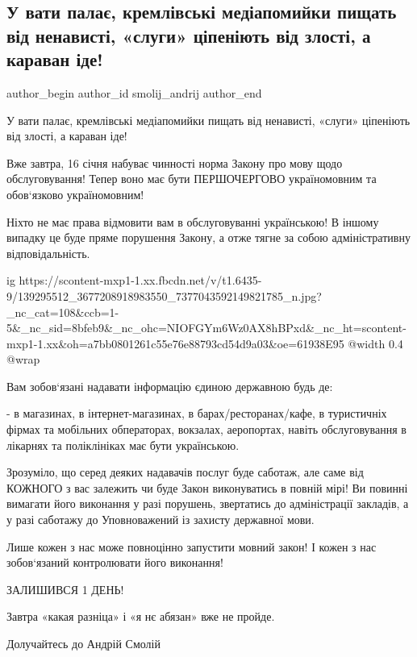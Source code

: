  
 
 
 
 
 
\subsection{У вати палає, кремлівські медіапомийки пищать від ненависті, «слуги» ціпеніють від злості, а караван іде!}
\label{sec:15_01_2021.fb.smolij_andrij.1.zakon_ukrainizacia}
 
\ifcmt
 author_begin
   author_id smolij_andrij
 author_end
\fi

У вати палає, кремлівські медіапомийки пищать від ненависті, «слуги» ціпеніють
від злості, а караван іде! 

Вже завтра, 16 січня набуває чинності норма Закону про мову щодо
обслуговування! Тепер воно має бути ПЕРШОЧЕРГОВО україномовним та обов‘язково
україномовним! 

Ніхто не має права відмовити вам в обслуговуванні українською! В іншому випадку
це буде пряме порушення Закону, а отже тягне за собою адміністративну
відповідальність. 

\ifcmt
  ig https://scontent-mxp1-1.xx.fbcdn.net/v/t1.6435-9/139295512_3677208918983550_7377043592149821785_n.jpg?_nc_cat=108&ccb=1-5&_nc_sid=8bfeb9&_nc_ohc=NIOFGYm6Wz0AX8hBPxd&_nc_ht=scontent-mxp1-1.xx&oh=a7bb0801261c55e76e88793cd54d9a03&oe=61938E95
  @width 0.4
  @wrap 
\fi

Вам зобов‘язані надавати інформацію єдиною державною будь де:

- в магазинах, в інтернет-магазинах, в барах/ресторанах/кафе, в туристичніх
фірмах та мобільних обператорах, вокзалах, аеропортах, навіть обслуговування в
лікарнях та поліклініках має бути українською. 

Зрозуміло, що серед деяких надавачів послуг буде саботаж, але саме від КОЖНОГО
з вас залежить чи буде Закон виконуватись в повній мірі! Ви повинні вимагати
його виконання у разі порушень, звертатись до адміністрації закладів, а у разі
саботажу до Уповноважений із захисту державної мови. 

Лише кожен з нас може повноцінно запустити мовний закон! І кожен з нас
зобов‘язаний контролювати його виконання! 

ЗАЛИШИВСЯ 1 ДЕНЬ! 

Завтра «какая разніца» і «я нє абязан» вже не пройде.

Долучайтесь до Андрій Смолій
